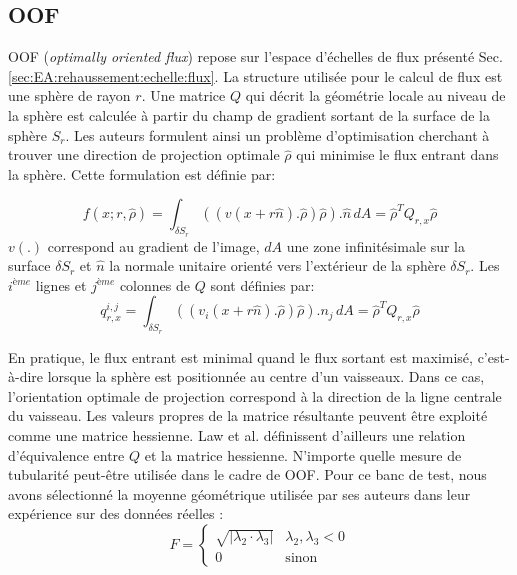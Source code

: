 \subsection{OOF}

OOF (\textit{optimally oriented flux}) repose sur l'espace d'échelles de flux présenté Sec. \ref{sec:EA:rehaussement:echelle:flux}. La structure utilisée pour le calcul de flux est une sphère de rayon $r$. Une matrice $Q$ qui décrit la géométrie locale au niveau de la sphère est calculée à partir du champ de gradient sortant de la surface de la sphère $S_r$. Les auteurs formulent ainsi un problème d'optimisation cherchant à trouver une direction de projection optimale  $\widehat{\rho}$ qui minimise le flux entrant dans la sphère. Cette formulation est définie par:

\begin{equation}
    f(x;r, \widehat{\rho} )= \int_{\delta S_r} (( v(x + r\widehat{n}).\widehat{\rho})\widehat{\rho}). \widehat{n}\,dA = \widehat{\rho}^{T}Q_{r,x}\widehat{\rho}  	\nonumber
\end{equation}
$v(.)$ correspond au gradient de l'image, $dA$ une zone infinitésimale sur la surface $\delta S_r$ et $\widehat{n}$ la normale unitaire orienté vers l'extérieur de la sphère $\delta S_r$.
Les $i^{ème}$ lignes et $j^{ème}$ colonnes de $Q$ sont définies par: 
\begin{equation}
    q_{r,x}^{i,j} = \int_{\delta S_r} (( v_i(x + r\widehat{n}).\widehat{\rho})\widehat{\rho}).n_j\,dA = \widehat{\rho}^{T}Q_{r,x}\widehat{\rho}  \nonumber	
\end{equation}

En pratique, le flux entrant est minimal quand le flux sortant est maximisé, c'est-à-dire lorsque la sphère est positionnée au centre d'un vaisseaux. Dans ce cas, l'orientation optimale de projection correspond à la direction de la ligne centrale du vaisseau. Les valeurs propres de la matrice résultante peuvent être exploité comme une matrice hessienne. Law et al. définissent d'ailleurs une relation d'équivalence entre $Q$ et la matrice hessienne.
N'importe quelle mesure de tubularité peut-être utilisée dans le cadre de OOF. Pour ce banc de test, nous avons sélectionné la moyenne géométrique utilisée par ses auteurs dans leur expérience sur des données réelles :
\begin{equation}
\nonumber
    F =
    \left\{
    \begin{array}{lr}
    
    \sqrt{|\lambda_2 \cdot \lambda_3|}   & \lambda_2, \lambda_3 < 0 \\
    0     & \textrm{sinon}
    \end{array}
    \right.
\end{equation}


